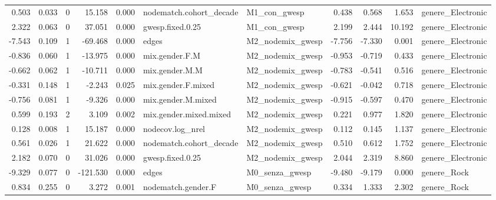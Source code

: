 \begin{table}
\begin{tabular}{rrrrrllrrrl}
    0.503 & 0.033 &        0 &   15.158 &     0.000 & nodematch.cohort\_decade &     M1\_con\_gwesp &   0.438 &   0.568 &   1.653 &           genere\_Electronic \\
    2.322 & 0.063 &        0 &   37.051 &     0.000 &        gwesp.fixed.0.25 &     M1\_con\_gwesp &   2.199 &   2.444 &  10.192 &           genere\_Electronic \\
   -7.543 & 0.109 &        1 &  -69.468 &     0.000 &                   edges & M2\_nodemix\_gwesp &  -7.756 &  -7.330 &   0.001 &           genere\_Electronic \\
   -0.836 & 0.060 &        1 &  -13.975 &     0.000 &          mix.gender.F.M & M2\_nodemix\_gwesp &  -0.953 &  -0.719 &   0.433 &           genere\_Electronic \\
   -0.662 & 0.062 &        1 &  -10.711 &     0.000 &          mix.gender.M.M & M2\_nodemix\_gwesp &  -0.783 &  -0.541 &   0.516 &           genere\_Electronic \\
   -0.331 & 0.148 &        1 &   -2.243 &     0.025 &      mix.gender.F.mixed & M2\_nodemix\_gwesp &  -0.621 &  -0.042 &   0.718 &           genere\_Electronic \\
   -0.756 & 0.081 &        1 &   -9.326 &     0.000 &      mix.gender.M.mixed & M2\_nodemix\_gwesp &  -0.915 &  -0.597 &   0.470 &           genere\_Electronic \\
    0.599 & 0.193 &        2 &    3.109 &     0.002 &  mix.gender.mixed.mixed & M2\_nodemix\_gwesp &   0.221 &   0.977 &   1.820 &           genere\_Electronic \\
    0.128 & 0.008 &        1 &   15.187 &     0.000 &        nodecov.log\_nrel & M2\_nodemix\_gwesp &   0.112 &   0.145 &   1.137 &           genere\_Electronic \\
    0.561 & 0.026 &        1 &   21.622 &     0.000 & nodematch.cohort\_decade & M2\_nodemix\_gwesp &   0.510 &   0.612 &   1.752 &           genere\_Electronic \\
    2.182 & 0.070 &        0 &   31.026 &     0.000 &        gwesp.fixed.0.25 & M2\_nodemix\_gwesp &   2.044 &   2.319 &   8.860 &           genere\_Electronic \\
   -9.329 & 0.077 &        0 & -121.530 &     0.000 &                   edges &   M0\_senza\_gwesp &  -9.480 &  -9.179 &   0.000 &                 genere\_Rock \\
    0.834 & 0.255 &        0 &    3.272 &     0.001 &      nodematch.gender.F &   M0\_senza\_gwesp &   0.334 &   1.333 &   2.302 &                 genere\_Rock \\

\end{tabular}
\end{table}
